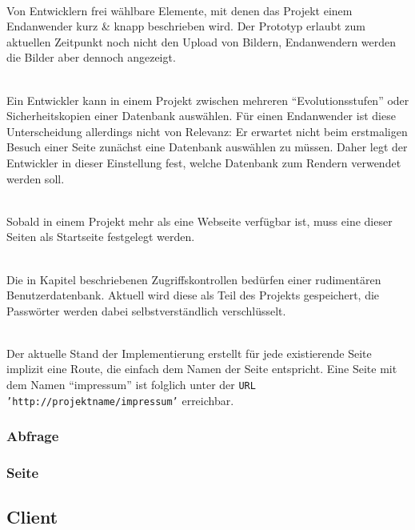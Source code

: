 \begin{description}[noitemsep]
\item[Name, Beschreibung \& Bild] \hfill \\
  Von Entwicklern frei wählbare Elemente, mit denen das Projekt einem Endanwender kurz \& knapp beschrieben wird. Der Prototyp erlaubt zum aktuellen Zeitpunkt noch nicht den Upload von Bildern, Endanwendern werden die Bilder aber dennoch angezeigt.
\item[Aktivierte Datenbank] \hfill \\
  Ein Entwickler kann in einem Projekt zwischen mehreren "`Evolutionsstufen"' oder Sicherheitskopien einer Datenbank auswählen. Für einen Endanwender ist diese Unterscheidung allerdings nicht von Relevanz: Er erwartet nicht beim erstmaligen Besuch einer Seite zunächst eine Datenbank auswählen zu müssen. Daher legt der Entwickler in dieser Einstellung fest, welche Datenbank zum Rendern verwendet werden soll.
\item[Startseite] \hfill \\
  Sobald in einem Projekt mehr als eine Webseite verfügbar ist, muss eine dieser Seiten als Startseite festgelegt werden.
\item[Benutzerdatenbank] \hfill \\
  Die in Kapitel  beschriebenen Zugriffskontrollen bedürfen einer rudimentären Benutzerdatenbank. Aktuell wird diese als Teil des Projekts gespeichert, die Passwörter werden dabei selbstverständlich verschlüsselt.
\item[Routendefinitionen (abgeleitet)] \hfill \\
  Der aktuelle Stand der Implementierung erstellt für jede existierende Seite implizit eine Route, die einfach dem Namen der Seite entspricht. Eine Seite mit dem Namen "`impressum"' ist folglich unter der \texttt{URL} \texttt{'http://projektname/impressum'} erreichbar. 
\end{description}

\subsubsection{Abfrage}
\label{sec:data-model-query}

\subsubsection{Seite}


\subsection{Client}

